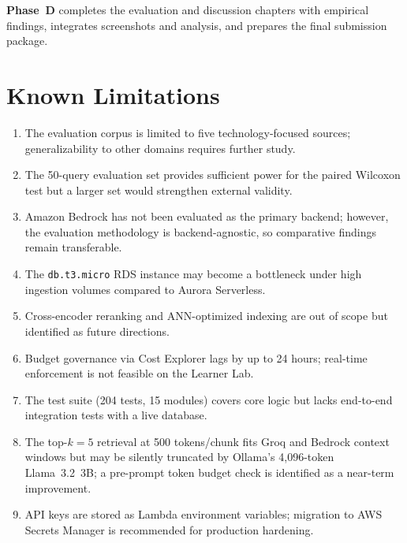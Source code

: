 \textbf{Phase~D} completes the evaluation and discussion chapters with empirical findings, integrates screenshots and analysis, and prepares the final submission package.

\section{Known Limitations}
\label{sec:limitations}

\begin{enumerate}[leftmargin=0.5in]
  \item The evaluation corpus is limited to five technology-focused sources; generalizability to other domains requires further study.

  \item The 50-query evaluation set provides sufficient power for the paired Wilcoxon test but a larger set would strengthen external validity.

  \item Amazon Bedrock has not been evaluated as the primary backend; however, the evaluation methodology is backend-agnostic, so comparative findings remain transferable.

  \item The \texttt{db.t3.micro} RDS instance may become a bottleneck under high ingestion volumes compared to Aurora Serverless.

  \item Cross-encoder reranking and ANN-optimized indexing are out of scope but identified as future directions.

  \item Budget governance via Cost Explorer lags by up to 24 hours; real-time enforcement is not feasible on the Learner Lab.

  \item The test suite (204 tests, 15 modules) covers core logic but lacks end-to-end integration tests with a live database.

  \item The top-$k = 5$ retrieval at 500 tokens/chunk fits Groq and Bedrock context windows but may be silently truncated by Ollama's 4{,}096-token Llama~3.2~3B; a pre-prompt token budget check is identified as a near-term improvement.

  \item API keys are stored as Lambda environment variables; migration to AWS Secrets Manager is recommended for production hardening.
\end{enumerate}

